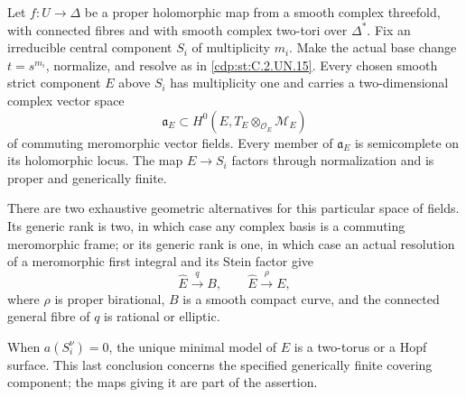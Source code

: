 
\begin{proposition}\label{cdp:st:C.2.UN.16}
Let $f:U\to\Delta$ be a proper holomorphic map from a smooth
complex threefold, with connected fibres and with smooth complex
two-tori over $\Delta^*$. Fix an irreducible central component $S_i$
of multiplicity $m_i$. Make the actual base change $t=s^{m_i}$,
normalize, and resolve as in \ref{cdp:st:C.2.UN.15}. Every chosen smooth strict
component $E$ above $S_i$ has multiplicity one and carries a
two-dimensional complex vector space
\[
 \mathfrak a_E\subset
 H^0(E,T_E\otimes_{\mathcal O_E}\mathcal M_E)
 \tag{C.CF.1}\label{cdp:eq:C.CF.1}
\]
of commuting meromorphic vector fields. Every member of
$\mathfrak a_E$ is semicomplete on its holomorphic locus.
The map $E\to S_i$ factors through normalization and is
proper and generically finite.

There are two exhaustive geometric alternatives for this particular
space of fields. Its generic rank is two, in which case any complex
basis is a commuting meromorphic frame; or its generic rank is one,
in which case an actual resolution of a meromorphic first integral
and its Stein factor give
\[
 \widehat E\xrightarrow{\ q\ }B,
 \qquad \widehat E\xrightarrow{\rho}E,
 \tag{C.CF.2}\label{cdp:eq:C.CF.2}
\]
where $\rho$ is proper birational, $B$ is a smooth compact curve,
and the connected general fibre of $q$ is rational or elliptic.

When $a(S_i^\nu)=0$, the unique minimal model of $E$ is a
two-torus or a Hopf surface. This last conclusion concerns the
specified generically finite covering component; the maps giving
it are part of the assertion.
\end{proposition}

